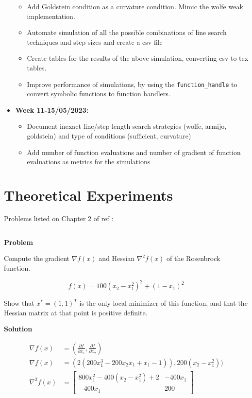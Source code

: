 \documentclass[a4paper,11pt]{article}
\numberwithin{equation}{section} %
\begin{document}
\begin{itemize}
\begin{itemize}
        \item Add Goldstein condition as a curvature condition. Mimic the wolfe weak implementation.
        \item Automate simulation of all the possible combinations of line search techniques and step sizes and create a csv file
        \item Create tables for the results of the above simulation, converting csv to tex tables.
        \item Improve performance of simulations, by using the \verb|function_handle| to convert symbolic functions to function handlers.
    \end{itemize}
    \item \textbf{Week 11-15/05/2023:}
    \begin{itemize}
        \item Document inexact line/step length search strategies (wolfe, armijo, goldstein) and type of conditions (sufficient, curvature)
        \item Add number of function evaluations and number of gradient of function evaluations as metrics for the simulations
    \end{itemize}
\end{itemize}
 
\pagebreak

\section{Theoretical Experiments}

Problems listed on Chapter 2 of ref \cite{nocedal1999numerical}:

\label{rosenbrock}
\subsection{}

\textbf{Problem}

Compute the gradient $\nabla f(x)$ and Hessian $\nabla^2 f(x)$ of the Rosenbrock function.

\begin{equation}
    f(x) = 100(x_2 -x_1^2)^2 + (1-x_1)^2 
\end{equation}

Show that $x^{\ast} = (1, 1)^{T}$ is the only local minimizer of this function, and that the Hessian matrix at that point is positive definite.


\textbf{Solution}

\begin{align}
    \nabla f(x) &= (\frac{\partial f}{\partial x_1}, \frac{\partial f}{\partial x_2}) \\
    \nabla f(x) &= (2(200x_1^3 -200x_2x_1 + x_1- 1)), 200(x_2 - x_1^2)) \\
    \nabla^2 f(x) &= 
    \begin{bmatrix}
    800x_1^2 - 400(x_2 - x_1^2) +2 & -400x_1 \\
    -400x_1 & 200
    \end{bmatrix}
\end{align}
\end{document}

